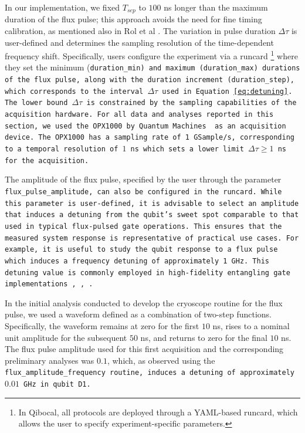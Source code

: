 In our implementation, we fixed $T_{sep}$ to $100$ ns longer than the maximum duration of the flux pulse; this approach avoids the need for fine timing calibration, as mentioned also in Rol et al \cite{rol_time-domain_2020}.
The variation in pulse duration $\Delta\tau$ is user-defined and determines the sampling resolution of the time-dependent frequency shift.
Specifically, users configure the experiment via a runcard \footnote{In Qibocal, all protocols are deployed through a YAML-based runcard, which allows the user to specify experiment-specific parameters.}
where they set the minimum (\tt{duration\_min}) and maximum (\tt{duration\_max}) durations of the flux pulse, along with the duration increment (\tt{duration\_step}), which corresponds to the interval $\Delta\tau$ used in Equation \ref{eq:detuning}.
The lower bound $\Delta\tau$ is constrained by the sampling capabilities of the acquisition hardware.
For all data and analyses reported in this section, we used the OPX1000 by Quantum Machines \cite{opx1000} as an acquisition device. 
The OPX1000 has a sampling rate of 1 GSample/s, corresponding to a temporal resolution of $1$ ns which sets a lower limit $\Delta\tau \geq 1$ ns for the acquisition.

The amplitude of the flux pulse, specified by the user through the parameter \tt{flux\_pulse\_amplitude}, can also be configured in the runcard. 
While this parameter is user-defined, it is advisable to select an amplitude that induces a detuning from the qubit's sweet spot comparable to that used in typical flux-pulsed gate operations. 
This ensures that the measured system response is representative of practical use cases.
For example, it is useful to study the qubit response to a flux pulse which induces a frequency detuning of approximately 1 GHz. 
This detuning value is commonly employed in high-fidelity entangling gate implementations \cite{Langford2017}, \cite{Bultink_2020}, \cite{Rol2019iju}.

In the initial analysis conducted to develop the cryoscope routine for the flux pulse, we used a waveform defined as a combination of two-step functions. 
Specifically, the waveform remains at zero for the first $10$ ns, rises to a nominal unit amplitude for the subsequent $50$ ns, and returns to zero for the final $10$ ns.
The flux pulse amplitude used for this first acquisition and the corresponding preliminary analyses was $0.1$, which, as observed using the \tt{flux\_amplitude\_frequency} routine, induces a detuning of approximately $0.01$ GHz in qubit \tt{D1}. 

